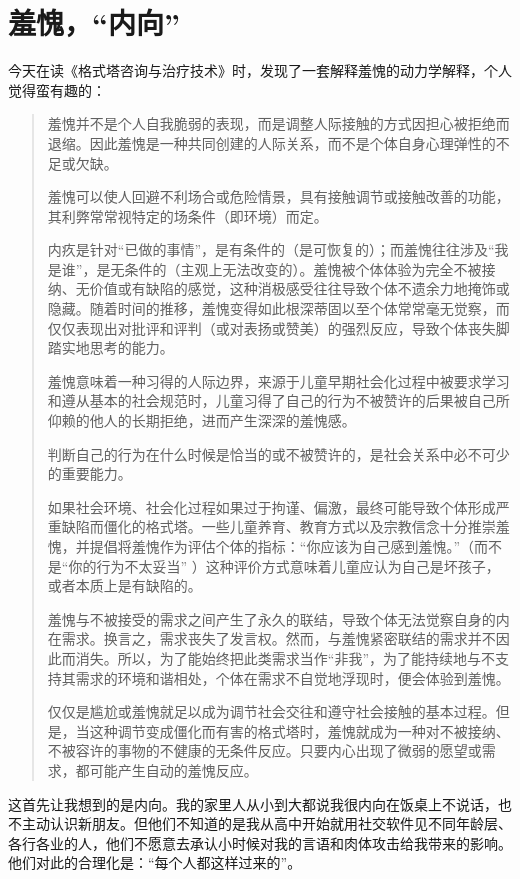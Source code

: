 \chapter{羞愧，“内向”}



今天在读《格式塔咨询与治疗技术》时，发现了一套解释羞愧的动力学解释，个人觉得蛮有趣的：

\blockquote{
    羞愧并不是个人自我脆弱的表现，而是调整人际接触的方式\pozhehao{}因担心被拒绝而退缩。因此羞愧是一种共同创建的人际关系，而不是个体自身心理弹性的不足或欠缺。

    羞愧可以使人回避不利场合或危险情景，具有接触调节或接触改善的功能，其利弊常常视特定的场条件（即环境）而定。

    内疚是针对“已做的事情”，是有条件的（是可恢复的）；而羞愧往往涉及“我是谁”，是无条件的（主观上无法改变的）。羞愧被个体体验为完全不被接纳、无价值或有缺陷的感觉，这种消极感受往往导致个体不遗余力地掩饰或隐藏。随着时间的推移，羞愧变得如此根深蒂固以至个体常常毫无觉察，而仅仅表现出对批评和评判（或对表扬或赞美）的强烈反应，导致个体丧失脚踏实地思考的能力。

    羞愧意味着一种习得的人际边界，来源于儿童早期社会化过程中被要求学习和遵从基本的社会规范时，儿童习得了自己的行为不被赞许的后果\pozhehao{}被自己所仰赖的他人的长期拒绝，进而产生深深的羞愧感。

    判断自己的行为在什么时候是恰当的或不被赞许的，是社会关系中必不可少的重要能力。

    如果社会环境、社会化过程如果过于拘谨、偏激，最终可能导致个体形成严重缺陷而僵化的格式塔。一些儿童养育、教育方式以及宗教信念十分推崇羞愧，并提倡将羞愧作为评估个体的指标：“你应该为自己感到羞愧。”（而不是“你的行为不太妥当” ）这种评价方式意味着儿童应认为自己是坏孩子，或者本质上是有缺陷的。

    羞愧与不被接受的需求之间产生了永久的联结，导致个体无法觉察自身的内在需求。换言之，需求丧失了发言权。然而，与羞愧紧密联结的需求并不因此而消失。所以，为了能始终把此类需求当作“非我”，为了能持续地与不支持其需求的环境和谐相处，个体在需求不自觉地浮现时，便会体验到羞愧。

    仅仅是尴尬或羞愧就足以成为调节社会交往和遵守社会接触的基本过程。但是，当这种调节变成僵化而有害的格式塔时，羞愧就成为一种对不被接纳、不被容许的事物的不健康的无条件反应。只要内心出现了微弱的愿望或需求，都可能产生自动的羞愧反应。
}

这首先让我想到的是内向。我的家里人从小到大都说我很内向\pozhehao{}在饭桌上不说话，也不主动认识新朋友。但他们不知道的是我从高中开始就用社交软件见不同年龄层、各行各业的人，他们不愿意去承认小时候对我的言语和肉体攻击给我带来的影响。他们对此的合理化是：“每个人都这样过来的”。

